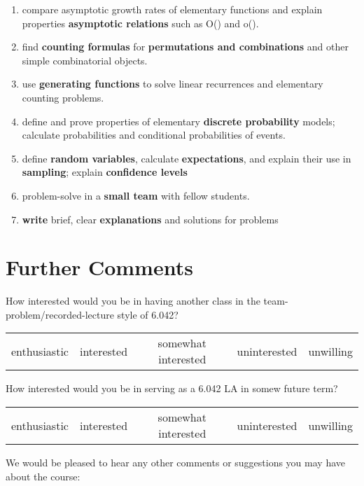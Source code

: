 \documentclass[handout]{mcs}
\begin{document}
\begin{enumerate}
\item \label{asymptotics} compare asymptotic growth rates of
  elementary functions and explain properties \textbf{asymptotic
    relations} such as O() and o().

\item \label{counting} find \textbf{counting formulas} for
  \textbf{permutations and combinations} and other simple
  combinatorial objects. \hfill \brule{0.5in}

\item\label{generating functions} use \textbf{generating functions} to solve
  linear recurrences and elementary counting problems.
  \hfill \brule{0.5in}

\item \label{probability} define and prove properties of elementary
  \textbf{discrete probability} models; calculate probabilities and
  conditional probabilities of events.  \hfill \brule{0.5in}

\item \label{random_variables} define \textbf{random variables},
  calculate \textbf{expectations}, and explain their use
  in \textbf{sampling}; explain \textbf{confidence levels} \hfill
  \brule{0.5in}

\item \label{student teams} problem-solve in a \textbf{small team} with
fellow students.  \hfill \brule{0.5in}

\item \label{writing} \textbf{write} brief, clear
  \textbf{explanations} and solutions for problems \hfill
  \brule{0.5in}
\end{enumerate}

\newpage
\section*{Further Comments}

How interested would you be in having another class in the
team-problem/recorded-lecture style of 6.042?
\begin{center}
\begin{tabular}{ccccc}
enthusiastic &  interested &  somewhat interested  &  uninterested &  unwilling
\end{tabular}
\end{center}

\noindent How interested would you be in serving as a 6.042 LA in somew future
term?
\begin{center}
\begin{tabular}{ccccc}
enthusiastic &  interested &  somewhat interested  &  uninterested &  unwilling
\end{tabular}
\end{center}

\vspace{0.5in}
We would be pleased to hear any other comments or suggestions you may have
about the course:

\textbox{\hspace{7in}
\vspace{6in}}
\end{document}
